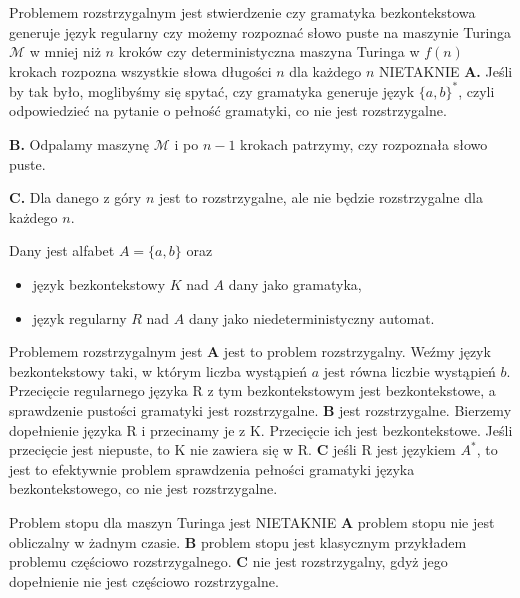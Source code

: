 \begin{solutions}
    \sol Problemem rozstrzygalnym jest stwierdzenie
    \answerss
    {czy gramatyka bezkontekstowa generuje język regularny}
    {czy możemy rozpoznać słowo puste na maszynie Turinga $\mathcal{M}$ w mniej niż $n$ kroków}
    {czy deterministyczna maszyna Turinga w $f(n)$ krokach rozpozna wszystkie słowa długości $n$ dla każdego $n$}
    {NIE}{TAK}{NIE}
    \textbf{A.} Jeśli by tak było, moglibyśmy się spytać, czy gramatyka generuje język $\{a,b\}^*$, czyli odpowiedzieć na pytanie o pełność gramatyki, co nie jest rozstrzygalne.

    \textbf{B.} Odpalamy maszynę $\mathcal{M}$ i po $n-1$ krokach patrzymy, czy rozpoznała słowo puste.

    \textbf{C.} Dla danego z góry $n$ jest to rozstrzygalne, ale nie będzie rozstrzygalne dla każdego $n$.
    
    \sol Dany jest alfabet $A = \{a, b\}$ oraz
    \begin{itemize}
        \item język bezkontekstowy $K$ nad $A$ dany jako gramatyka,
        \item język regularny $R$ nad $A$ dany jako niedeterministyczny automat.
    \end{itemize}
    Problemem rozstrzygalnym jest
    \textbf{A} jest to problem rozstrzygalny. Weźmy język bezkontekstowy taki, w którym liczba wystąpień $a$ jest równa liczbie wystąpień $b$. Przecięcie regularnego języka R z tym bezkontekstowym jest bezkontekstowe, a sprawdzenie pustości gramatyki jest rozstrzygalne. \textbf{B} jest rozstrzygalne. Bierzemy dopełnienie języka R i przecinamy je z K. Przecięcie ich jest bezkontekstowe. Jeśli przecięcie jest niepuste, to K nie zawiera się w R. \textbf{C} jeśli R jest językiem $A^*$, to jest to efektywnie problem sprawdzenia pełności gramatyki języka bezkontekstowego, co nie jest rozstrzygalne.
    
    \sol Problem stopu dla maszyn Turinga jest
    {NIE}{TAK}{NIE}
    \textbf{A} problem stopu nie jest obliczalny w żadnym czasie. \textbf{B} problem stopu jest klasycznym przykładem problemu częściowo rozstrzygalnego. \textbf{C} nie jest rozstrzygalny, gdyż jego dopełnienie nie jest częściowo rozstrzygalne.
\end{solutions}
